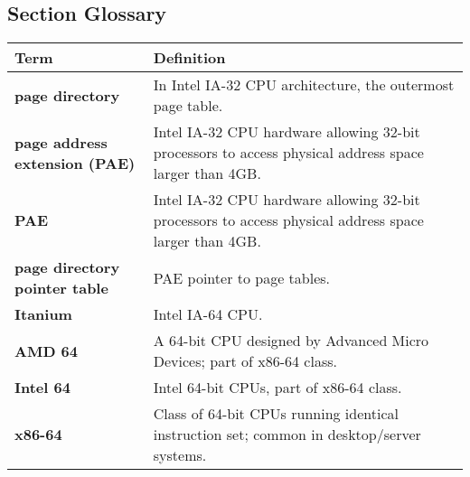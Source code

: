 \subsection*{Section Glossary}
\begin{tabular}{p{}p{}}
\toprule
\textbf{Term} & \textbf{Definition} \\
\midrule
\textbf{page directory} & In Intel IA-32 CPU architecture, the outermost page table. \\
\textbf{page address extension (PAE)} & Intel IA-32 CPU hardware allowing 32-bit processors to access physical address space larger than 4GB. \\
\textbf{PAE} & Intel IA-32 CPU hardware allowing 32-bit processors to access physical address space larger than 4GB. \\
\textbf{page directory pointer table} & PAE pointer to page tables. \\
\textbf{Itanium} & Intel IA-64 CPU. \\
\textbf{AMD 64} & A 64-bit CPU designed by Advanced Micro Devices; part of x86-64 class. \\
\textbf{Intel 64} & Intel 64-bit CPUs, part of x86-64 class. \\
\textbf{x86-64} & Class of 64-bit CPUs running identical instruction set; common in desktop/server systems. \\
\bottomrule
\end{tabular}

